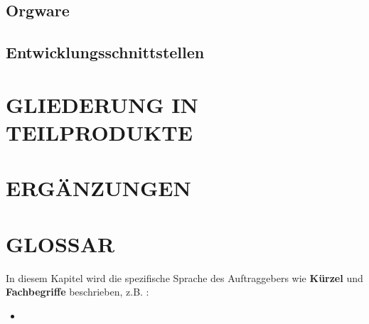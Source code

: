 	\subsection{Orgware}
	\subsection{Entwicklungsschnittstellen}
	
	
	\section{\Large GLIEDERUNG IN TEILPRODUKTE}
	
	
	\section{\Large ERGÄNZUNGEN}

	
\newpage
	\section{\Large GLOSSAR}
	In diesem Kapitel wird die spezifische Sprache des Auftraggebers wie \textbf{ Kürzel } und \textbf{ Fachbegriffe } beschrieben, z.B. :
	\begin{itemize}
		\item
	\end{itemize}

		